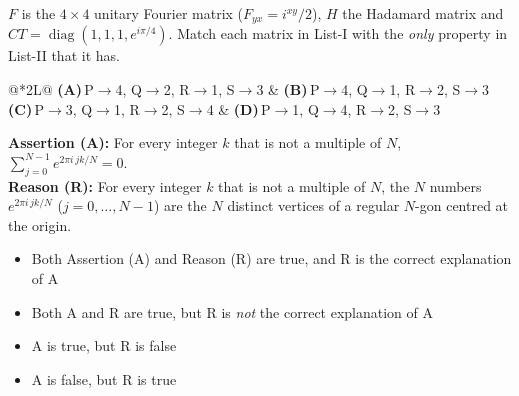 \documentclass[11pt,a4paper]{article}
\newcommand{\optlabel}[1]{\textbf{(#1)}}
\newenvironment{qitem}[1]{\begin{list}{}{\setlength{\leftmargin}{3.3em}\setlength{\labelwidth}{3.1em}%
  \setlength{\labelsep}{0.2em}\setlength{\topsep}{3pt}\setlength{\parsep}{3pt}}\item[\textbf{Q.#1}\hfill]}{\end{list}}
\newcommand{\qsep}{\par\vspace{2pt}{\color{black!15}\hrule}\vspace{4pt}}
\begin{document}
\begin{qitem}{16}
$F$ is the $4\times4$ unitary Fourier matrix ($F_{yx} = i^{xy}/2$), $H$ the Hadamard matrix and
$CT = \operatorname{diag}(1, 1, 1, e^{i\pi/4})$. Match each matrix in List-I with the \emph{only} property in List-II that it has.
\par\smallskip{}
\par\smallskip\noindent\begin{tabularx}{\linewidth}{@{}*{2}{L}@{}}
\optlabel{A}\,P$\to$4, Q$\to$2, R$\to$1, S$\to$3 & \optlabel{B}\,P$\to$4, Q$\to$1, R$\to$2, S$\to$3 \\[3pt]
\optlabel{C}\,P$\to$3, Q$\to$1, R$\to$2, S$\to$4 & \optlabel{D}\,P$\to$1, Q$\to$4, R$\to$2, S$\to$3
\end{tabularx}
\end{qitem}
\qsep

\begin{qitem}{17}
\textbf{Assertion (A):} For every integer $k$ that is not a multiple of $N$, $\displaystyle\sum_{j=0}^{N-1} e^{2\pi i\,jk/N} = 0$.\\[1mm]
\textbf{Reason (R):} For every integer $k$ that is not a multiple of $N$, the $N$ numbers $e^{2\pi i\,jk/N}$
($j = 0, \dots, N-1$) are the $N$ distinct vertices of a regular $N$-gon centred at the origin.
\begin{itemize}[leftmargin=2.6em, labelsep=0.4em, itemsep=2pt, topsep=3pt]
\item[\optlabel{A}] Both Assertion (A) and Reason (R) are true, and R is the correct explanation of A
\item[\optlabel{B}] Both A and R are true, but R is \emph{not} the correct explanation of A
\item[\optlabel{C}] A is true, but R is false
\item[\optlabel{D}] A is false, but R is true
\end{itemize}
\end{qitem}
\qsep
\end{document}

